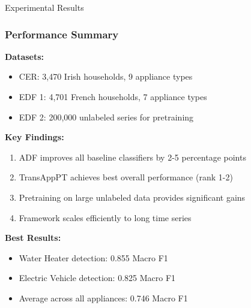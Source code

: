 \documentclass{beamer}
\begin{document}
\begin{frame}{Experimental Results}
\frametitle{Performance Summary}

\textbf{Datasets:}
\begin{itemize}
    \item CER: 3,470 Irish households, 9 appliance types
    \item EDF 1: 4,701 French households, 7 appliance types
    \item EDF 2: 200,000 unlabeled series for pretraining
\end{itemize}

\vspace{0.3cm}

\textbf{Key Findings:}
\begin{enumerate}
    \item ADF improves all baseline classifiers by 2-5 percentage points
    \item TransAppPT achieves best overall performance (rank 1-2)
    \item Pretraining on large unlabeled data provides significant gains
    \item Framework scales efficiently to long time series
\end{enumerate}

\vspace{0.3cm}

\textbf{Best Results:}
\begin{itemize}
    \item Water Heater detection: 0.855 Macro F1
    \item Electric Vehicle detection: 0.825 Macro F1
    \item Average across all appliances: 0.746 Macro F1
\end{itemize}

\end{frame}
\end{document}
